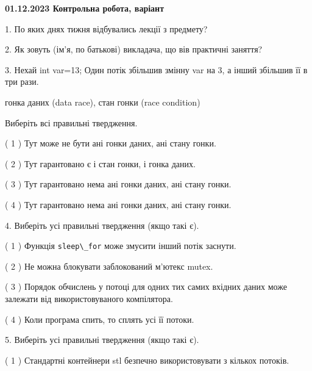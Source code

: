 \documentclass[12pt, ukrainian]{article}
\def\code#1{\Verb!#1!}
\begin{document}
\vspace{4mm}
\newpage
\begin {large}

\textbf{01.12.2023 Контрольна робота, варіант  }\par


{
1. По яких днях тижня відбувались лекції з предмету?



\vspace{5mm}
2. Як зовуть (ім'я, по батькові) викладача, що вів практичні заняття?



\vspace{5mm}
3. Нехай int var=13; Один потік збільшив змінну var на 3, а інший збільшив її в три рази.

гонка даних (data race), стан гонки (race condition)

Виберіть всі правильні твердження.\par
\vspace{2mm}
( 1 ) Тут може не бути ані гонки даних, ані стану гонки.%

( 2 ) Тут гарантовано є і стан гонки, і гонка даних.%

( 3 ) Тут гарантовано нема ані гонки даних, ані стану гонки.%

( 4 ) Тут гарантовано нема ані гонки даних, ані стану гонки.%


\vspace{5mm}
4. Виберіть усі правильні твердження (якщо такі є).\par
\vspace{2mm}

( 1 ) Функція \code{sleep\_for} може змусити інший потік заснути.%

( 2 ) Не можна блокувати заблокований м’ютекс mutex.%

( 3 ) Порядок обчислень у потоці для одних тих самих вхідних даних може залежати від використовуваного компілятора.%

( 4 ) Коли програма спить, то сплять усі її потоки.%


\vspace{5mm}
5. Виберіть усі правильні твердження (якщо такі є).\par
\vspace{2mm}

( 1 ) Стандартні контейнери stl безпечно використовувати з кількох потоків.%

}
\end{large}
\end{document}
